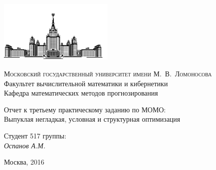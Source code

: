 \documentclass[12pt, a4paper]{article}
\begin{document}
    \thispagestyle{empty}

    \begin{singlespace}
    \begin{titlepage}
        \begin{center}
            \includegraphics[height = 3cm]{msu.png}

            {\scshape Московский государственный университет имени М.~В.~Ломоносова}\\
            Факультет вычислительной математики и кибернетики\\
            Кафедра математических методов прогнозирования\\
            \centerline{\hfill\hrulefill\hrulefill\hrulefill\hrulefill\hfill}

            \vfill

            {\LARGE Отчет к третьему практическому заданию по МОМО: \\ Выпуклая негладкая, условная и структурная оптимизация}

            \vspace{1cm}

        \end{center}

        \vfill

        \begin{flushright}
            Студент 517 группы:\\
                \textit{Оспанов А.М.}

            \vspace{5mm}

        \end{flushright}

        \vfill

        \begin{center}
            Москва, 2016
        \end{center}
    \end{titlepage}
    \end{singlespace}

    \newpage

    \def \picwidth {17cm}
    \def \picheight {7.5cm}
\end{document}
